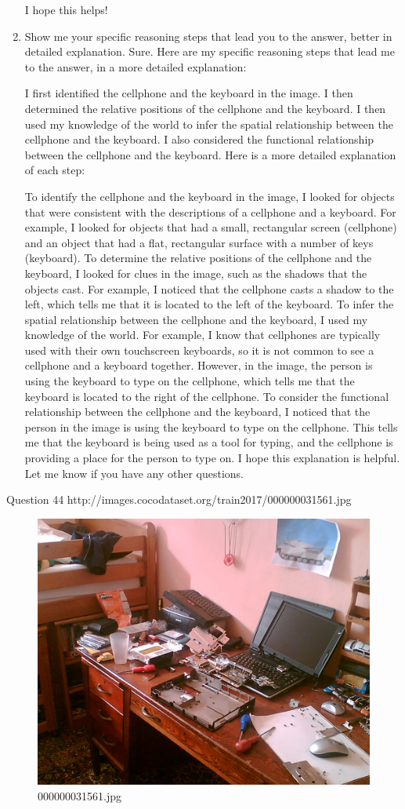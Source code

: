 \begin{enumerate}
    I hope this helps!
    \item Show me your specific reasoning steps that lead you to the answer, better in detailed explanation.
    \subitem Sure. Here are my specific reasoning steps that lead me to the answer, in a more detailed explanation:

    I first identified the cellphone and the keyboard in the image.
    I then determined the relative positions of the cellphone and the keyboard.
    I then used my knowledge of the world to infer the spatial relationship between the cellphone and the keyboard.
    I also considered the functional relationship between the cellphone and the keyboard.
    Here is a more detailed explanation of each step:
    
    To identify the cellphone and the keyboard in the image, I looked for objects that were consistent with the descriptions of a cellphone and a keyboard. For example, I looked for objects that had a small, rectangular screen (cellphone) and an object that had a flat, rectangular surface with a number of keys (keyboard).
    To determine the relative positions of the cellphone and the keyboard, I looked for clues in the image, such as the shadows that the objects cast. For example, I noticed that the cellphone casts a shadow to the left, which tells me that it is located to the left of the keyboard.
    To infer the spatial relationship between the cellphone and the keyboard, I used my knowledge of the world. For example, I know that cellphones are typically used with their own touchscreen keyboards, so it is not common to see a cellphone and a keyboard together. However, in the image, the person is using the keyboard to type on the cellphone, which tells me that the keyboard is located to the right of the cellphone.
    To consider the functional relationship between the cellphone and the keyboard, I noticed that the person in the image is using the keyboard to type on the cellphone. This tells me that the keyboard is being used as a tool for typing, and the cellphone is providing a place for the person to type on.
    I hope this explanation is helpful. Let me know if you have any other questions.
\end{enumerate}
Question 44
http://images.cocodataset.org/train2017/000000031561.jpg
\begin{figure}[h]
    \centering
    \includegraphics[width=0.8\linewidth]{../image set/hard/000000031561.jpg}
    \caption{000000031561.jpg}
\end{figure}
